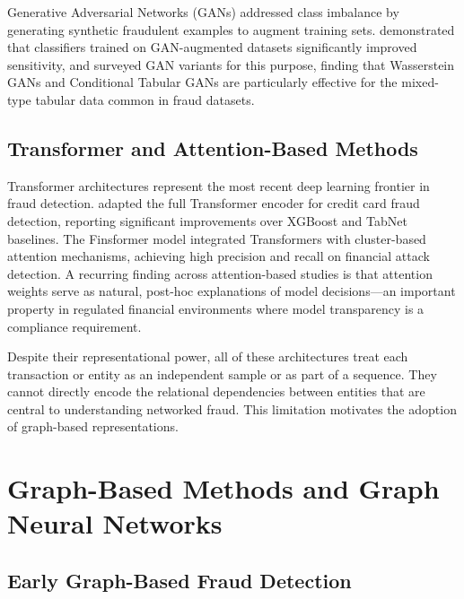 Generative Adversarial Networks (GANs) addressed class imbalance by generating
synthetic fraudulent examples to augment training sets. \cite{fiore2019using}
demonstrated that classifiers trained on GAN-augmented datasets significantly improved
sensitivity, and \cite{alamri2023survey} surveyed GAN variants for this purpose,
finding that Wasserstein GANs and Conditional Tabular GANs are particularly effective
for the mixed-type tabular data common in fraud datasets.

\subsection{Transformer and Attention-Based Methods}

Transformer architectures represent the most recent deep learning frontier in fraud
detection. \cite{yu2024credit} adapted the full Transformer encoder for credit card
fraud detection, reporting significant improvements over XGBoost and TabNet baselines.
The Finsformer model \cite{finsformer2024} integrated Transformers with cluster-based
attention mechanisms, achieving high precision and recall on financial attack detection.
A recurring finding across attention-based studies is that attention weights serve as
natural, post-hoc explanations of model decisions—an important property in regulated
financial environments where model transparency is a compliance requirement.

Despite their representational power, all of these architectures treat each transaction
or entity as an independent sample or as part of a sequence. They cannot directly encode
the relational dependencies between entities that are central to understanding networked
fraud. This limitation motivates the adoption of graph-based representations.

\section{Graph-Based Methods and Graph Neural Networks}

\subsection{Early Graph-Based Fraud Detection}

